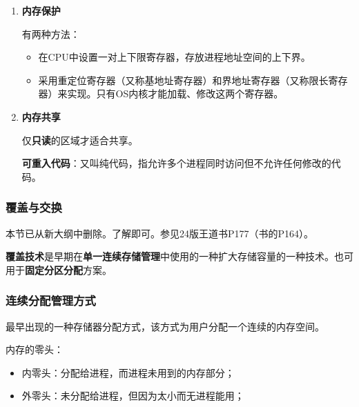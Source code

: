\documentclass[12pt, a4paper, oneside]{ctexart}
\begin{document}
\begin{enumerate}
  \item {\bf 内存保护}
  
  有两种方法：
  \begin{itemize}
    \item 在CPU中设置一对上下限寄存器，存放进程地址空间的上下界。
    \item 采用重定位寄存器（又称基地址寄存器）和界地址寄存器（又称限长寄存器）来实现。只有OS内核才能加载、修改这两个寄存器。
  \end{itemize}

  \item {\bf 内存共享}
  
  仅\textbf{只读}的区域才适合共享。

  \textbf{可重入代码}：又叫纯代码，指允许多个进程同时访问但不允许任何修改的代码。
\end{enumerate}

\subsubsection{覆盖与交换}

本节已从新大纲中删除。了解即可。参见24版王道书P177（书的P164）。

\textbf{覆盖技术}是早期在\textbf{单一连续存储管理}中使用的一种扩大存储容量的一种技术。也可用于\textbf{固定分区分配}方案。

\subsubsection{连续分配管理方式}

最早出现的一种存储器分配方式，该方式为用户分配一个连续的内存空间。

内存的零头：
\begin{itemize}
  \item 内零头：分配给进程，而进程未用到的内存部分；
  \item 外零头：未分配给进程，但因为太小而无进程能用；
\end{itemize}
\end{document}
